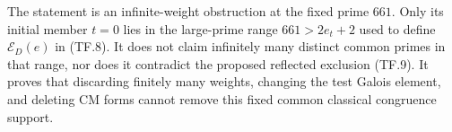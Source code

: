 The statement is an infinite-weight obstruction at the
fixed prime $661$. Only its initial member $t=0$ lies in
the large-prime range $661>2e_t+2$ used to define
$\mathcal E_D(e)$ in (TF.8). It does not claim infinitely
many distinct common primes in that range, nor does it
contradict the proposed reflected exclusion (TF.9).
It proves that discarding finitely many weights, changing
the test Galois element, and deleting CM forms cannot
remove this fixed common classical congruence support.


